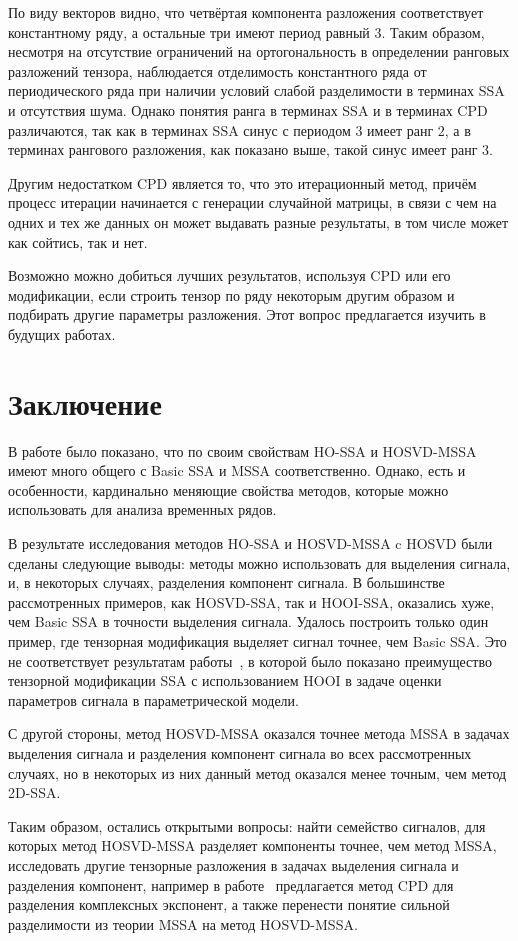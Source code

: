 \documentclass[specialist,
    substylefile = spbu_report.rtx,
    subf,href,colorlinks=true, 12pt]{disser}
\theoremstyle{plain}
\theoremstyle{definition}
\theoremstyle{remark}
\begin{document}
    По виду векторов видно, что четвёртая компонента разложения соответствует константному ряду, а остальные три имеют период равный $3$.
    Таким образом, несмотря на отсутствие ограничений на ортогональность в определении ранговых разложений тензора, наблюдается
    отделимость константного ряда от периодического ряда при наличии условий слабой разделимости в терминах SSA и отсутствия
    шума.
    Однако понятия ранга в терминах SSA и в терминах CPD различаются, так как в терминах SSA синус с периодом $3$ имеет ранг $2$, а в
    терминах рангового разложения, как показано выше, такой синус имеет ранг $3$.

    Другим недостатком CPD является то, что это итерационный метод, причём процесс итерации начинается
    с генерации случайной матрицы, в связи с чем на одних и тех же данных он может выдавать разные результаты, в том
    числе может как сойтись, так и нет.

    Возможно можно добиться лучших результатов, используя CPD или его модификации, если строить тензор по ряду
    некоторым другим образом и подбирать другие параметры разложения.
    Этот вопрос предлагается изучить в будущих работах.
    \newpage


    \section{Заключение}\label{sec:conclusion}
    В работе было показано, что по своим свойствам HO-SSA и HOSVD-MSSA имеют много общего 
    с Basic SSA и MSSA соответственно.
    Однако, есть и особенности, кардинально меняющие свойства методов, которые можно использовать для анализа временных рядов.

    В результате исследования методов HO-SSA и HOSVD-MSSA c HOSVD были сделаны следующие выводы:
    методы можно использовать для выделения сигнала, и, в некоторых случаях, разделения компонент сигнала.
    В большинстве рассмотренных примеров, как HOSVD-SSA, так и HOOI-SSA, оказались хуже,
    чем Basic SSA в точности выделения сигнала.
    Удалось построить только один пример, где тензорная модификация выделяет сигнал точнее, чем Basic SSA.
    Это не соответствует результатам работы~\cite{hosvd-hooi-separation}, в которой было показано преимущество 
    тензорной модификации SSA с использованием HOOI в задаче оценки параметров сигнала в параметрической модели.

    С другой стороны, метод HOSVD-MSSA оказался точнее метода MSSA в задачах выделения сигнала и 
    разделения компонент сигнала во всех рассмотренных случаях, но в
    некоторых из них данный метод оказался менее точным, чем метод 2D-SSA.

    Таким образом, остались открытыми вопросы: найти семейство сигналов, для которых метод HOSVD-MSSA 
    разделяет компоненты точнее, чем метод MSSA, исследовать другие тензорные разложения в задачах выделения сигнала
    и разделения компонент,
    например в работе~\cite{cpd-separation} предлагается метод CPD для разделения комплексных экспонент, а также
    перенести понятие сильной разделимости из теории MSSA на метод HOSVD-MSSA.

    
    
\end{document}
